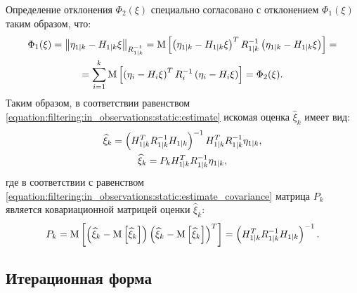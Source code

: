 Определение отклонения $\Phi_2(\xi)$ специально согласовано с отклонением $\Phi_1(\xi)$ таким образом, что:
\begin{multline*}
	\Phi_1(\xi)
	= \left \| \eta_{1|k} - H_{1|k} \xi \right \|_{R_{1|k}^{-1}}
	= \mathrm{M} \left [ \left ( \eta_{1|k} - H_{1|k} \xi \right )^T R_{1|k}^{-1} \left ( \eta_{1|k} - H_{1|k} \xi \right ) \right ] = \\
	= \sum_{i=1}^k \mathrm{M} \left [ \left ( \eta_i - H_i \xi \right )^T R_i^{-1} \left ( \eta_i - H_i \xi \right ) \right ]
	= \Phi_2(\xi)
	.
\end{multline*}
Таким образом, в соответствии равенством \eqref{equation:filtering:in_observations:static:estimate} искомая оценка $\widehat{\xi}_k$ имеет вид:
\begin{gather}
	\widehat{\xi}_k = \left ( H_{1|k}^T R_{1|k}^{-1} H_{1|k} \right )^{-1} H_{1|k}^T R_{1|k}^{-1} \eta_{1|k} , \notag \\
	\widehat{\xi}_k = P_k H_{1|k}^T R_{1|k}^{-1} \eta_{1|k}
		\label{equation:filtering:in_observations:dynamic:block:current_estimate},
\end{gather}
где в соответствии с равенством \eqref{equation:filtering:in_observations:static:estimate_covariance} матрица $P_k$ является ковариационной матрицей оценки $\widehat{\xi}_k$:
$$
	P_{k} = \mathrm{M} \left [ \left ( \widehat{\xi}_k - \mathrm{M} \left [ \widehat{\xi}_k \right ] \right ) \left ( \widehat{\xi}_k - \mathrm{M} \left [ \widehat{\xi}_k \right ] \right )^T \right ] = \left ( H_{1|k}^T R_{1|k}^{-1} H_{1|k} \right )^{-1} .
$$

\subsection{Итерационная форма}

